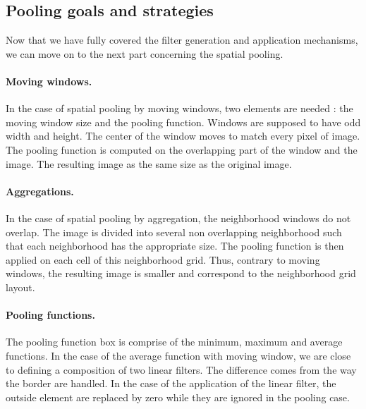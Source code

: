 \documentclass[a4paper]{report}
\begin{document}
		\subsection{Pooling goals and strategies}
		Now that we have fully covered the filter generation and application mechanisms, we can move on to the next part concerning the spatial pooling.
			\paragraph{Moving windows.}
			In the case of spatial pooling by moving windows, two elements are needed : the moving window size and the pooling function. Windows are supposed to have odd width and height. The center of the window moves to match every pixel of image. The pooling function is computed on the overlapping part of the window and the image. The resulting image as the same size as the original image.
			\paragraph{Aggregations.}
			In the case of spatial pooling by aggregation, the neighborhood windows do not overlap. The image is divided into several non overlapping neighborhood such that each neighborhood has the appropriate size. The pooling function is then applied on each cell of this neighborhood grid. Thus, contrary to moving windows, the resulting image is smaller and correspond to the neighborhood grid layout.
			\paragraph{Pooling functions.}
			The pooling function box is comprise of the minimum, maximum and average functions. In the case of the average function with moving window, we are close to defining a composition of two linear filters. The difference comes from the way the border are handled. In the case of the application of the linear filter, the outside element are replaced by zero while they are ignored in the pooling case.
			
\end{document}
